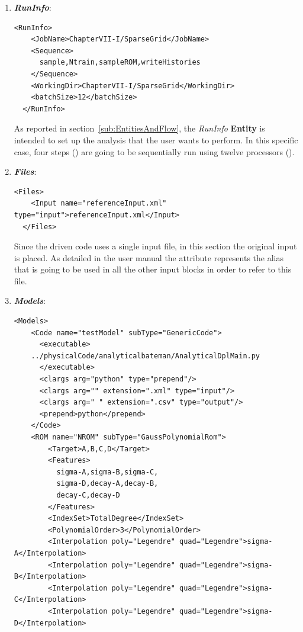 \begin{enumerate}
   \item \textbf{\textit{RunInfo}}:
\begin{lstlisting}[style=XML,morekeywords={arg,extension,pauseAtEnd,overwrite}]
  <RunInfo>
    <JobName>ChapterVII-I/SparseGrid</JobName>
    <Sequence>
      sample,Ntrain,sampleROM,writeHistories
    </Sequence>
    <WorkingDir>ChapterVII-I/SparseGrid</WorkingDir>
    <batchSize>12</batchSize>
  </RunInfo>
\end{lstlisting}   
   As reported in section~\ref{sub:EntitiesAndFlow}, the \textit{RunInfo} \textbf{Entity} is intended to set up the analysis 
   that the user wants to perform. In this specific case, four steps () are going to be sequentially run 
   using twelve processors (). 
   \item \textbf{\textit{Files}}:
\begin{lstlisting}[style=XML,morekeywords={arg,extension,pauseAtEnd,overwrite}]
  <Files>
    <Input name="referenceInput.xml" type="input">referenceInput.xml</Input>
  </Files>
\end{lstlisting}
   Since the driven code uses a single input file, in this section the original input is placed. As detailed in the user manual
   the attribute   represents the alias that is going to be used in all the other input blocks in order to refer to this file.
   \item \textbf{\textit{Models}}:
\begin{lstlisting}[style=XML,morekeywords={arg,extension,pauseAtEnd,overwrite}]
  <Models>
    <Code name="testModel" subType="GenericCode">
      <executable>
    ../physicalCode/analyticalbateman/AnalyticalDplMain.py
      </executable>
      <clargs arg="python" type="prepend"/>
      <clargs arg="" extension=".xml" type="input"/>
      <clargs arg=" " extension=".csv" type="output"/>
      <prepend>python</prepend>
    </Code>
    <ROM name="NROM" subType="GaussPolynomialRom">
        <Target>A,B,C,D</Target>
        <Features>
          sigma-A,sigma-B,sigma-C,
          sigma-D,decay-A,decay-B,
          decay-C,decay-D
        </Features>
        <IndexSet>TotalDegree</IndexSet>
        <PolynomialOrder>3</PolynomialOrder>
        <Interpolation poly="Legendre" quad="Legendre">sigma-A</Interpolation>
        <Interpolation poly="Legendre" quad="Legendre">sigma-B</Interpolation>
        <Interpolation poly="Legendre" quad="Legendre">sigma-C</Interpolation>
        <Interpolation poly="Legendre" quad="Legendre">sigma-D</Interpolation>

\end{lstlisting}
\end{enumerate}
